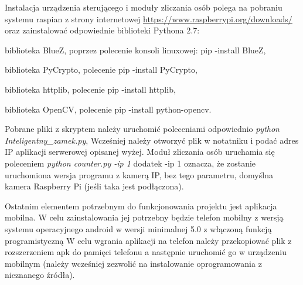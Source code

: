 Instalacja urządzenia sterującego i moduły zliczania osób polega na pobraniu systemu raspian z strony internetowej \href{https://www.raspberrypi.org/downloads/}{https://www.raspberrypi.org/downloads/} oraz zainstalować odpowiednie biblioteki Pythona 2.7:
\begin{itemize*}
	\item biblioteka BlueZ, poprzez polecenie konsoli linuxowej: pip -install BlueZ,
	\item biblioteka PyCrypto, polecenie pip -install PyCrypto,
	\item biblioteka httplib, polecenie pip -install httplib,
	\item biblioteka OpenCV, polecenie pip -install python-opencv.
\end{itemize*}

Pobrane pliki z skryptem należy uruchomić poleceniami odpowiednio \textit{python Inteligentny\_zamek.py}, Wcześniej należy otworzyć plik w notatniku i podać adres IP aplikacji serwerowej opisanej wyżej. Moduł zliczania osób uruchamia się poleceniem \textit{python counter.py -ip 1} dodatek -ip 1 oznacza, że zostanie uruchomiona wersja programu z kamerą IP, bez tego parametru, domyślna kamera Raspberry Pi (jeśli taka jest podłączona).

Ostatnim elementem potrzebnym do funkcjonowania projektu jest aplikacja mobilna. W celu zainstalowania jej potrzebny będzie telefon mobilny z wersją systemu operacyjnego android w wersji minimalnej 5.0 z włączoną funkcją programistyczną  W celu wgrania aplikacji na telefon należy przekopiować plik z rozszerzeniem apk do pamięci telefonu a następnie uruchomić go w urządzeniu mobilnym (należy wcześniej zezwolić na instalowanie oprogramowania z nieznanego źródła).

